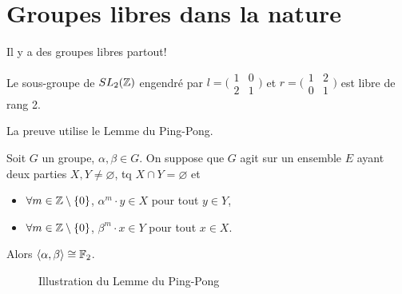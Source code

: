   \section{Groupes libres dans la nature}
  \label{sec:grp-libre-nature}
  
  Il y a des groupes libres partout!

  \begin{prop} \label{prop-ss-grp-sl2}
    Le sous-groupe de $SL_2(\mathbb{Z})$ engendré par $l = \big( \begin{smallmatrix} 1&0\\ 2&1 \end{smallmatrix}\big)$
    et $r = \big( \begin{smallmatrix} 1&2\\ 0&1 \end{smallmatrix}\big)$ est libre de rang 2.
  \end{prop}

  La preuve utilise le Lemme du Ping-Pong.

  \begin{lem} \label{lem-ping-pong}
    Soit $G$ un groupe, $\alpha, \beta \in G$. On suppose que $G$ agit sur un ensemble $E$ ayant deux parties
    $X, Y \neq \varnothing$, tq $X \cap Y = \varnothing$ et
    \begin{itemize}
    \item $\forall m \in \mathbb{Z} \setminus \{0\}$, $\alpha^m \cdot y \in X$ pour tout $y \in Y$,
    \item $\forall m \in \mathbb{Z} \setminus \{0\}$, $\beta^m \cdot x \in Y$ pour tout $x \in X$.
    \end{itemize}
    Alors $\langle \alpha, \beta \rangle \cong \mathbb{F}_2$.
  \end{lem}

  \begin{figure}[h]
    \centering
    \caption{Illustration du Lemme du Ping-Pong}
    \label{fig:lem-ping-pong}
  \end{figure}

